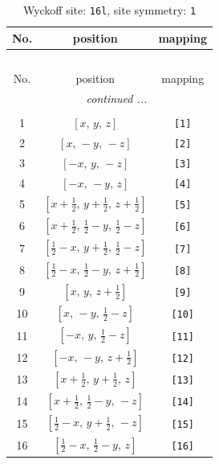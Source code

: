 \documentclass[fleqn,8pt]{jsarticle}
\begin{document}
\begin{longtable}{ccc}
\caption{Wyckoff site: {\tt 16l}, site symmetry: {\tt 1}}
 \\
 \hline \hline
No. & position & mapping \\ \hline \endfirsthead

\multicolumn{2}{l}{\tablename\ \thetable{}} \\
 \hline \hline
No. & position & mapping \\ \hline \endhead

 \hline \hline
\multicolumn{2}{r}{\footnotesize\it continued ...} \\ \endfoot

 \hline \hline
\multicolumn{2}{r}{} \\ \endlastfoot

1 & $\left[ x,\, y,\, z \right]$ & {\tt [1]} \\ \hline
2 & $\left[ x,\, - y,\, - z \right]$ & {\tt [2]} \\ \hline
3 & $\left[ - x,\, y,\, - z \right]$ & {\tt [3]} \\ \hline
4 & $\left[ - x,\, - y,\, z \right]$ & {\tt [4]} \\ \hline
5 & $\left[ x + \frac{1}{2},\, y + \frac{1}{2},\, z + \frac{1}{2} \right]$ & {\tt [5]} \\ \hline
6 & $\left[ x + \frac{1}{2},\, \frac{1}{2} - y,\, \frac{1}{2} - z \right]$ & {\tt [6]} \\ \hline
7 & $\left[ \frac{1}{2} - x,\, y + \frac{1}{2},\, \frac{1}{2} - z \right]$ & {\tt [7]} \\ \hline
8 & $\left[ \frac{1}{2} - x,\, \frac{1}{2} - y,\, z + \frac{1}{2} \right]$ & {\tt [8]} \\ \hline
9 & $\left[ x,\, y,\, z + \frac{1}{2} \right]$ & {\tt [9]} \\ \hline
10 & $\left[ x,\, - y,\, \frac{1}{2} - z \right]$ & {\tt [10]} \\ \hline
11 & $\left[ - x,\, y,\, \frac{1}{2} - z \right]$ & {\tt [11]} \\ \hline
12 & $\left[ - x,\, - y,\, z + \frac{1}{2} \right]$ & {\tt [12]} \\ \hline
13 & $\left[ x + \frac{1}{2},\, y + \frac{1}{2},\, z \right]$ & {\tt [13]} \\ \hline
14 & $\left[ x + \frac{1}{2},\, \frac{1}{2} - y,\, - z \right]$ & {\tt [14]} \\ \hline
15 & $\left[ \frac{1}{2} - x,\, y + \frac{1}{2},\, - z \right]$ & {\tt [15]} \\ \hline
16 & $\left[ \frac{1}{2} - x,\, \frac{1}{2} - y,\, z \right]$ & {\tt [16]} \\
\end{longtable}
\end{document}

